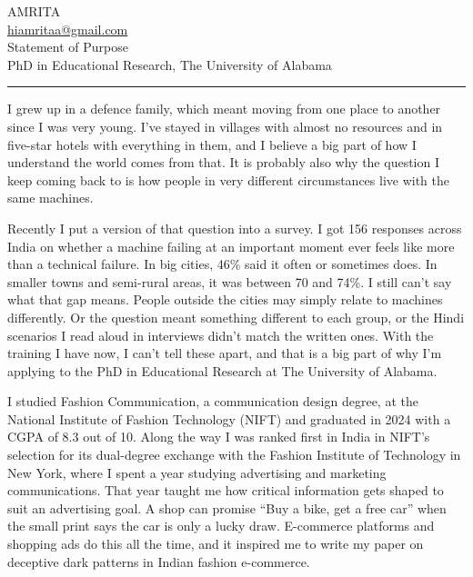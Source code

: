 \documentclass[11pt,letterpaper]{article}
\begin{document}
\begin{center}
  {\Large\MakeUppercase{Amrita}}\\[5pt]
  {\small \href{mailto:hiamritaa@gmail.com}{hiamritaa@gmail.com}}\\[8pt]
  {\large Statement of Purpose}\\[3pt]
  {\small PhD in Educational Research, The University of Alabama}
\end{center}
\vspace{-4pt}
\noindent\textcolor{cvblue}{\rule{\linewidth}{0.5pt}}
\vspace{2pt}

I grew up in a defence family, which meant moving from one place to another since I was very young. I've stayed in villages with almost no resources and in five-star hotels with everything in them, and I believe a big part of how I understand the world comes from that. It is probably also why the question I keep coming back to is how people in very different circumstances live with the same machines.

Recently I put a version of that question into a survey. I got 156 responses across India on whether a machine failing at an important moment ever feels like more than a technical failure. In big cities, 46\% said it often or sometimes does. In smaller towns and semi-rural areas, it was between 70 and 74\%. I still can't say what that gap means. People outside the cities may simply relate to machines differently. Or the question meant something different to each group, or the Hindi scenarios I read aloud in interviews didn't match the written ones. With the training I have now, I can't tell these apart, and that is a big part of why I'm applying to the PhD in Educational Research at The University of Alabama.

I studied Fashion Communication, a communication design degree, at the National Institute of Fashion Technology (NIFT) and graduated in 2024 with a CGPA of 8.3 out of 10. Along the way I was ranked first in India in NIFT's selection for its dual-degree exchange with the Fashion Institute of Technology in New York, where I spent a year studying advertising and marketing communications. That year taught me how critical information gets shaped to suit an advertising goal. A shop can promise ``Buy a bike, get a free car'' when the small print says the car is only a lucky draw. E-commerce platforms and shopping ads do this all the time, and it inspired me to write my paper on deceptive dark patterns in Indian fashion e-commerce.
\end{document}

